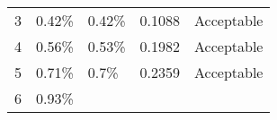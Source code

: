 \begin{longtable}[]{@{}lllll@{}}
\begin{minipage}[t]{0.12\columnwidth}
3\strut
\end{minipage} & \begin{minipage}[t]{0.26\columnwidth}\raggedright
0.42\%\strut
\end{minipage} & \begin{minipage}[t]{0.12\columnwidth}\raggedright
0.42\%\strut
\end{minipage} & \begin{minipage}[t]{0.19\columnwidth}\raggedright
0.1088\strut
\end{minipage} & \begin{minipage}[t]{0.18\columnwidth}\raggedright
Acceptable\strut
\end{minipage}\tabularnewline
\begin{minipage}[t]{0.12\columnwidth}\raggedright
4\strut
\end{minipage} & \begin{minipage}[t]{0.26\columnwidth}\raggedright
0.56\%\strut
\end{minipage} & \begin{minipage}[t]{0.12\columnwidth}\raggedright
0.53\%\strut
\end{minipage} & \begin{minipage}[t]{0.19\columnwidth}\raggedright
0.1982\strut
\end{minipage} & \begin{minipage}[t]{0.18\columnwidth}\raggedright
Acceptable\strut
\end{minipage}\tabularnewline
\begin{minipage}[t]{0.12\columnwidth}\raggedright
5\strut
\end{minipage} & \begin{minipage}[t]{0.26\columnwidth}\raggedright
0.71\%\strut
\end{minipage} & \begin{minipage}[t]{0.12\columnwidth}\raggedright
0.7\%\strut
\end{minipage} & \begin{minipage}[t]{0.19\columnwidth}\raggedright
0.2359\strut
\end{minipage} & \begin{minipage}[t]{0.18\columnwidth}\raggedright
Acceptable\strut
\end{minipage}\tabularnewline
\begin{minipage}[t]{0.12\columnwidth}\raggedright
6\strut
\end{minipage} & \begin{minipage}[t]{0.26\columnwidth}\raggedright
0.93\%\strut

\end{minipage}
\end{longtable}
